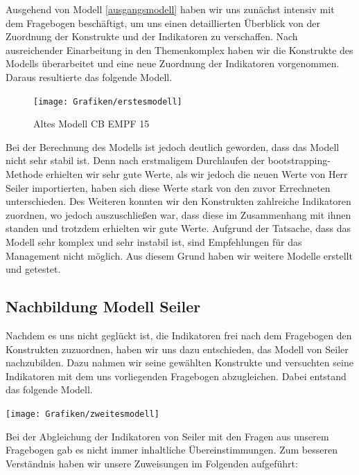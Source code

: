 \documentclass{article}\usepackage[]{graphicx}\usepackage[]{color}
\begin{document}
\newpage
Ausgehend von Modell \ref{ausgangsmodell} haben wir uns zunächst intensiv mit dem Fragebogen beschäftigt, um uns einen detaillierten Überblick von der Zuordnung der Konstrukte und der Indikatoren zu verschaffen. Nach ausreichender Einarbeitung in den Themenkomplex haben wir die Konstrukte des Modells überarbeitet und eine neue Zuordnung der Indikatoren vorgenommen. Daraus resultierte das folgende Modell.\\


\begin{figure}[h!]
\centering
\hspace*{-4.8cm}\texttt{[image: Grafiken/erstesmodell]}
\caption{Altes Modell CB EMPF 15}
\label{erstesmodell}
\end{figure}


\newpage
Bei der Berechnung des Modells ist jedoch deutlich geworden, dass das Modell nicht sehr stabil ist. Denn nach erstmaligem Durchlaufen der bootstrapping- Methode erhielten wir sehr gute Werte, als wir jedoch die neuen Werte von Herr Seiler importierten, haben sich diese Werte stark von den zuvor Errechneten unterschieden. Des Weiteren konnten wir den Konstrukten zahlreiche Indikatoren zuordnen, wo jedoch auszuschließen war, dass diese im Zusammenhang mit ihnen standen und trotzdem erhielten wir gute Werte. Aufgrund der Tatsache, dass das Modell sehr komplex und sehr instabil ist, sind Empfehlungen für das Management nicht möglich. Aus diesem Grund haben wir weitere Modelle erstellt und getestet. 

\subsection{Nachbildung Modell Seiler}
Nachdem es uns nicht geglückt ist, die Indikatoren frei nach dem Fragebogen den Konstrukten zuzuordnen, haben wir uns dazu entschieden, das Modell von Seiler nachzubilden. Dazu nahmen wir seine gewählten Konstrukte und versuchten seine Indikatoren mit dem uns vorliegenden Fragebogen abzugleichen. Dabei entstand das folgende Modell.


\hspace*{-4.8cm}\texttt{[image: Grafiken/zweitesmodell]}


Bei der Abgleichung der Indikatoren von Seiler mit den Fragen aus unserem Fragebogen gab es nicht immer inhaltliche Übereinstimmungen. Zum besseren Verständnis haben wir unsere Zuweisungen im Folgenden aufgeführt:


\end{document}
